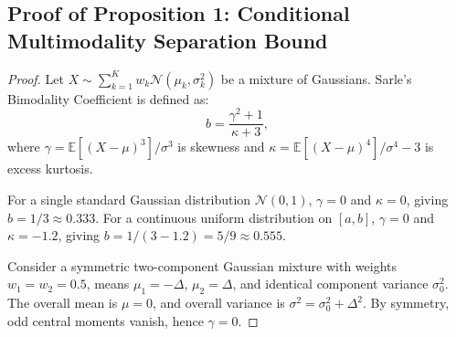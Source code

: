 \documentclass[10pt,journal,compsoc]{IEEEtran}
\begin{document}
\subsection{Proof of Proposition 1: Conditional Multimodality Separation Bound}
\begin{proof}
Let $X \sim \sum_{k=1}^K w_k \mathcal{N}(\mu_k, \sigma_k^2)$ be a mixture of Gaussians. Sarle's Bimodality Coefficient is defined as:
\begin{equation}
    b = \frac{\gamma^2 + 1}{\kappa + 3},
\end{equation}
where $\gamma = \mathbb{E}[(X - \mu)^3] / \sigma^3$ is skewness and $\kappa = \mathbb{E}[(X - \mu)^4] / \sigma^4 - 3$ is excess kurtosis. 

For a single standard Gaussian distribution $\mathcal{N}(0, 1)$, $\gamma = 0$ and $\kappa = 0$, giving $b = 1/3 \approx 0.333$. For a continuous uniform distribution on $[a, b]$, $\gamma = 0$ and $\kappa = -1.2$, giving $b = 1 / (3 - 1.2) = 5/9 \approx 0.555$. 

Consider a symmetric two-component Gaussian mixture with weights $w_1 = w_2 = 0.5$, means $\mu_1 = -\Delta$, $\mu_2 = \Delta$, and identical component variance $\sigma_0^2$. The overall mean is $\mu = 0$, and overall variance is $\sigma^2 = \sigma_0^2 + \Delta^2$. By symmetry, odd central moments vanish, hence $\gamma = 0$. 


\end{proof}
\end{document}
